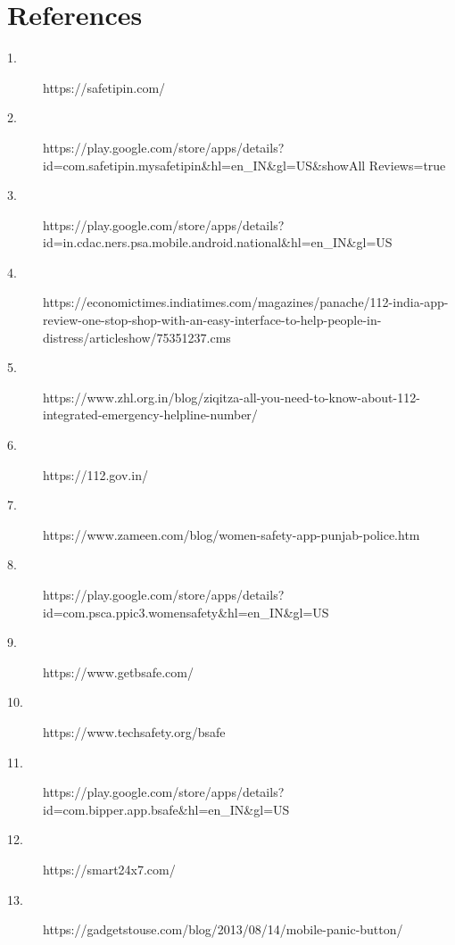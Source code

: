 \documentclass[	DIV=calc,%
							paper=a4,%
							fontsize=12pt,%
							twocolumn]{scrartcl}
\begin{document}
\section*{References}
\begin{description}
    \item[1.] https://safetipin.com/
    \item[2.] https://play.google.com/store/apps/details?id=com.safetipin.mysafetipin\&hl=en\_IN\&gl=US\&showAll
              Reviews=true
    \item[3.] https://play.google.com/store/apps/details?id=in.cdac.ners.psa.mobile.android.national\&hl=en\_IN\&gl=US
    \item[4.] https://economictimes.indiatimes.com/magazines/panache/112-india-app-review-one-stop-shop-with-an-easy-interface-to-help-people-in-distress/articleshow/75351237.cms
    \item[5.] https://www.zhl.org.in/blog/ziqitza-all-you-need-to-know-about-112-integrated-emergency-helpline-number/
    \item[6.] https://112.gov.in/
    \item[7.] https://www.zameen.com/blog/women-safety-app-punjab-police.htm
    \item[8.] https://play.google.com/store/apps/details?id=com.psca.ppic3.womensafety\&hl=en\_IN\&gl=US
    \item[9.] https://www.getbsafe.com/
    \item[10.] https://www.techsafety.org/bsafe
    \item[11.] https://play.google.com/store/apps/details?id=com.bipper.app.bsafe\&hl=en\_IN\&gl=US
    \item[12.] https://smart24x7.com/
    \item[13.] https://gadgetstouse.com/blog/2013/08/14/mobile-panic-button/
\end{description}
\end{document}
